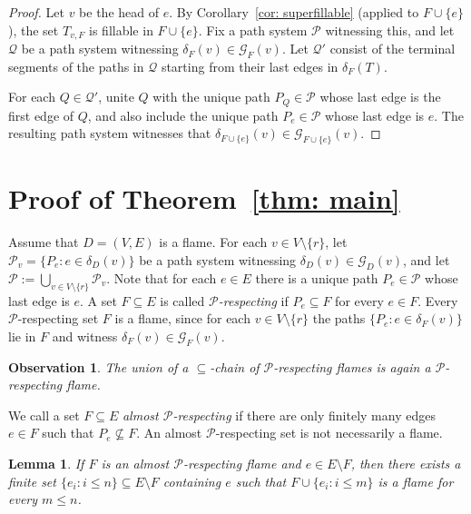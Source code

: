 \documentclass[12pt,a4paper]{amsart}
\theoremstyle{plain}
\newtheorem{lemma}[theorem]{Lemma}
\newtheorem{observation}[theorem]{Observation}
\theoremstyle{definition}
\begin{document}
\begin{proof}
Let $v$ be the head of $e$. By Corollary~\ref{cor: superfillable} (applied to
$F\cup\{e\}$), the set $T_{v,F}$ is fillable in $F\cup\{e\}$. Fix a path system
$\mathcal{P}$ witnessing this, and let $\mathcal{Q}$ be a path system witnessing
$\delta_F(v)\in \mathcal{G}_F(v)$. Let $\mathcal{Q}'$ consist of the terminal segments of
the paths in $\mathcal{Q}$ starting from their last edges in $\delta_F(T)$.

For each $Q\in \mathcal{Q}'$, unite $Q$ with the unique path $P_Q\in \mathcal{P}$ whose
last edge is the first edge of $Q$, and also include the unique path $P_e\in\mathcal{P}$
whose last edge is $e$. The resulting path system witnesses that
$\delta_{F\cup\{e\}}(v)\in \mathcal{G}_{F\cup\{e\}}(v)$.
\end{proof}

\section{Proof of Theorem~\ref{thm: main}}\label{sec: main}

Assume that $D=(V,E)$ is a flame. For each $v\in V\setminus\{r\}$, let
$\mathcal{P}_v=\{P_e : e\in \delta_D(v)\}$
be a path system witnessing $\delta_D(v)\in \mathcal{G}_D(v)$, and let
$\mathcal{P}:=\bigcup_{v\in V\setminus\{r\}}\mathcal{P}_v$. Note that for each $e\in E$ there is a unique path $P_e\in\mathcal{P}$ whose last 
edge is $e$. A set $F\subseteq E$ is called \emph{$\mathcal{P}$-respecting} if $P_e\subseteq F$ for
every $e\in F$. Every $\mathcal{P}$-respecting set $F$ is a flame, since for each
$v\in V\setminus\{r\}$ the paths $\{P_e : e\in \delta_F(v)\}$  lie in $F$ and witness $\delta_F(v)\in \mathcal{G}_F(v)$.

\begin{observation}
The union of a $\subseteq$-chain of $\mathcal{P}$-respecting flames is again a
$\mathcal{P}$-respecting flame.
\end{observation}
We call a set $F\subseteq E$ \emph{almost $\mathcal{P}$-respecting} if there are only
finitely many edges $e\in F$ such that $P_e\not\subseteq F$. An almost
$\mathcal{P}$-respecting set is not necessarily a flame.

\begin{lemma}\label{lem: add fin}
If $F$ is an almost $\mathcal{P}$-respecting flame and $e\in E\setminus F$, then there
exists a finite set $\{e_i : i\leq n\}\subseteq E\setminus F$ containing $e$ such that
$F\cup\{e_i : i\leq m\}$ is a flame for every $m\leq n$.
\end{lemma}
\end{document}
